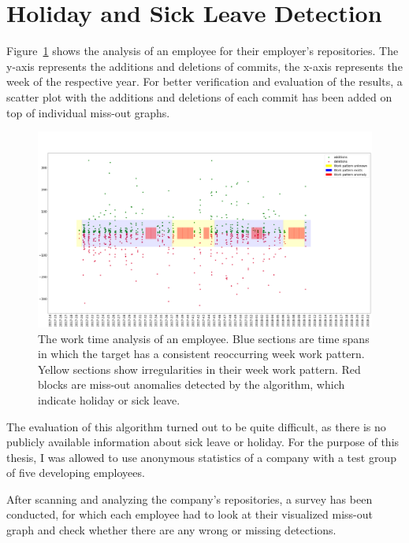 \section{Holiday and Sick Leave Detection}

Figure~\ref{fig:missing-time} shows the analysis of an employee for their employer's repositories.
The y-axis represents the additions and deletions of commits, the x-axis represents the week of the respective year.
For better verification and evaluation of the results, a scatter plot with the additions and deletions of each commit has been added on top of individual miss-out graphs.

\begin{figure}[h]
    \includegraphics[scale=0.19]{./graphs/analysis/work-time-analysis}
    \centering
    \caption{
        The work time analysis of an employee.
        Blue sections are time spans in which the target has a consistent reoccurring week work pattern.
        Yellow sections show irregularities in their week work pattern.
        Red blocks are miss-out anomalies detected by the algorithm, which indicate holiday or sick leave.
    }\label{fig:missing-time}
\end{figure}

The evaluation of this algorithm turned out to be quite difficult, as there is no publicly available information about sick leave or holiday.
For the purpose of this thesis, I was allowed to use anonymous statistics of a company with a test group of five developing employees.

After scanning and analyzing the company's repositories, a survey has been conducted, for which each employee had to look at their visualized miss-out graph and check whether there are any wrong or missing detections.

